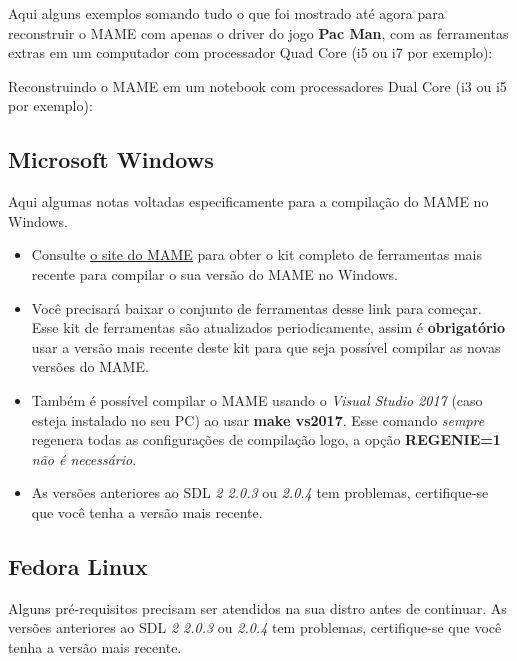 \documentclass[letterpaper,10pt,brazil]{sphinxmanual}
\begin{document}
Aqui alguns exemplos somando tudo o que foi mostrado até agora para
reconstruir o MAME com apenas o driver do jogo \textbf{Pac Man}, com as
ferramentas extras em um computador com processador Quad Core (i5 ou i7
por exemplo):
\begin{quote}

\end{quote}

Reconstruindo o MAME em um notebook com processadores Dual Core (i3 ou i5 por exemplo):
\begin{quote}

\end{quote}


\subsection{Microsoft Windows}
\label{initialsetup/compilingmame:microsoft-windows}
Aqui algumas notas voltadas especificamente para a compilação do MAME no
Windows.
\begin{itemize}
\item {} 
Consulte \href{https://mamedev.org/tools/}{o site do MAME} para obter o
kit completo de ferramentas mais recente para compilar o sua versão do
MAME no Windows.

\item {} 
Você precisará baixar o conjunto de ferramentas desse link para
começar. Esse kit de ferramentas são atualizados periodicamente,
assim é \textbf{obrigatório} usar a versão mais recente deste kit para
que seja possível compilar as novas versões do MAME.

\item {} 
Também é possível compilar o MAME usando o \emph{Visual Studio 2017}
(caso esteja instalado no seu PC) ao usar \textbf{make vs2017}. Esse
comando \emph{sempre} regenera todas as configurações de compilação logo,
a opção \textbf{REGENIE=1} \emph{não é necessário}.

\item {} 
As versões anteriores ao SDL \emph{2 2.0.3} ou \emph{2.0.4} tem problemas,
certifique-se que você tenha a versão mais recente.

\end{itemize}


\subsection{Fedora Linux}
\label{initialsetup/compilingmame:fedora-linux}
Alguns pré-requisitos precisam ser atendidos na sua distro antes de
continuar. As versões anteriores ao SDL \emph{2 2.0.3} ou \emph{2.0.4} tem
problemas, certifique-se que você tenha a versão mais recente.
\begin{quote}

\end{quote}
\end{document}
